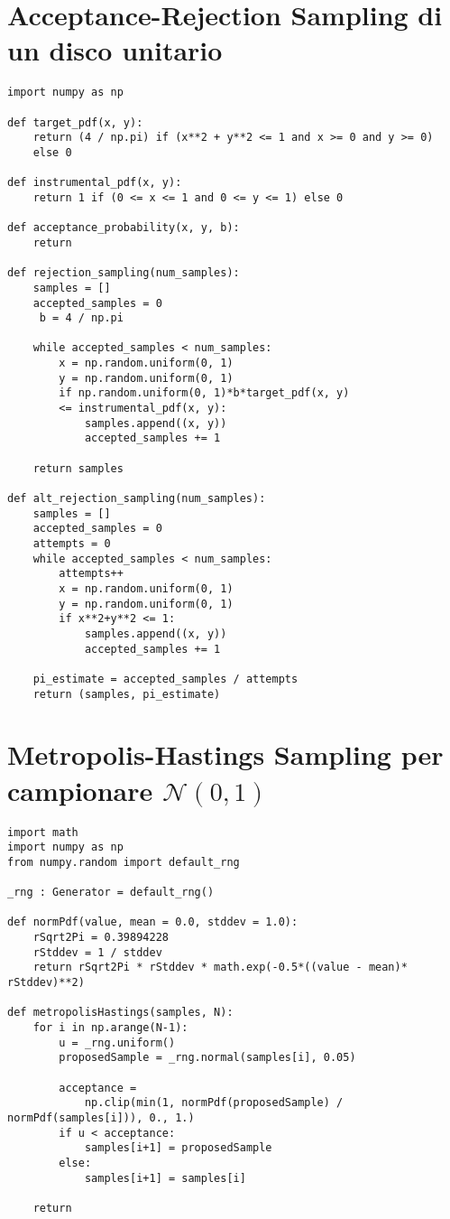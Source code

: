 \section{Acceptance-Rejection Sampling di un disco unitario}\label{appendixD:rejectionSampling}
\begin{verbatim}
import numpy as np

def target_pdf(x, y):
    return (4 / np.pi) if (x**2 + y**2 <= 1 and x >= 0 and y >= 0) 
	else 0

def instrumental_pdf(x, y):
    return 1 if (0 <= x <= 1 and 0 <= y <= 1) else 0

def acceptance_probability(x, y, b):
    return 

def rejection_sampling(num_samples):
    samples = []
    accepted_samples = 0
	 b = 4 / np.pi

    while accepted_samples < num_samples:
        x = np.random.uniform(0, 1)
        y = np.random.uniform(0, 1)
        if np.random.uniform(0, 1)*b*target_pdf(x, y) 
		<= instrumental_pdf(x, y):
            samples.append((x, y))
            accepted_samples += 1

    return samples

def alt_rejection_sampling(num_samples):
	samples = []
	accepted_samples = 0
	attempts = 0
    while accepted_samples < num_samples:
		attempts++
        x = np.random.uniform(0, 1)
        y = np.random.uniform(0, 1)
        if x**2+y**2 <= 1:
            samples.append((x, y))
            accepted_samples += 1

	pi_estimate = accepted_samples / attempts
	return (samples, pi_estimate)
\end{verbatim}
\section{Metropolis-Hastings Sampling per campionare $\mathcal{N}(0,1)$}\label{appendixD:metropolisHastings}
\begin{verbatim}
import math
import numpy as np
from numpy.random import default_rng

_rng : Generator = default_rng()

def normPdf(value, mean = 0.0, stddev = 1.0):
    rSqrt2Pi = 0.39894228
    rStddev = 1 / stddev
    return rSqrt2Pi * rStddev * math.exp(-0.5*((value - mean)* rStddev)**2)

def metropolisHastings(samples, N):
    for i in np.arange(N-1):
        u = _rng.uniform()
        proposedSample = _rng.normal(samples[i], 0.05)

		acceptance = 
			np.clip(min(1, normPdf(proposedSample) / normPdf(samples[i])), 0., 1.)
        if u < acceptance:
            samples[i+1] = proposedSample
        else:
            samples[i+1] = samples[i]

    return
\end{verbatim}
